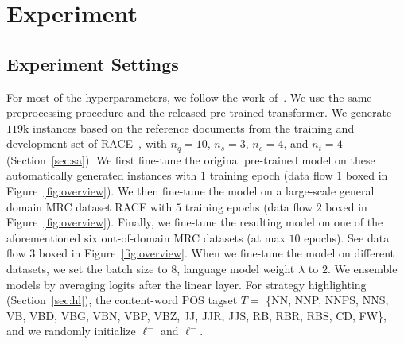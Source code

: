 \documentclass[11pt,a4paper]{article}
\begin{document}
 




 \section{Experiment}
\label{sec:experiment}

\subsection{Experiment Settings}
For most of the hyperparameters, we follow the work of~. We use the same preprocessing procedure and the released pre-trained transformer. We generate $119$k instances based on the reference documents from the training and development set of RACE~\cite{lai2017race}, with $n_q=10$, $n_s=3$, $n_c=4$, and $n_t=4$ (Section~\ref{sec:sa}). We first fine-tune the original pre-trained model on these automatically generated instances with $1$ training epoch (data flow $1$ boxed in Figure~\ref{fig:overview}). We then fine-tune the model on a large-scale general domain MRC dataset RACE with $5$ training epochs (data flow $2$ boxed in Figure~\ref{fig:overview}). Finally, we fine-tune the resulting model on one of the aforementioned six out-of-domain MRC datasets (at max $10$ epochs). See data flow $3$ boxed in Figure~\ref{fig:overview}. When we fine-tune the model on different datasets, we set the batch size to $8$, language model weight $\lambda$ to $2$. We ensemble models by averaging logits after the linear layer. For strategy highlighting (Section~\ref{sec:hl}), the content-word POS tagset $T=$ \{NN, NNP, NNPS, NNS, VB, VBD, VBG, VBN, VBP, VBZ, JJ, JJR, JJS, RB, RBR, RBS, CD, FW\}, and we randomly initialize $\bm{\ell^{+}}$ and $\bm{\ell^{-}}$. 
\end{document}
